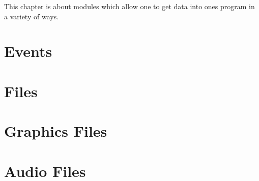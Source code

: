 %
% 
% 
\def\FileCreated{Sat Jun 23 02:24:49 2001}
\def\FileRevised{Sat Jun 23 02:26:40 2001}

This chapter is about modules which allow one to get data into ones
program in a variety of ways.

\section{Events}
\section{Files}
\section{Graphics Files}
\section{Audio Files}
